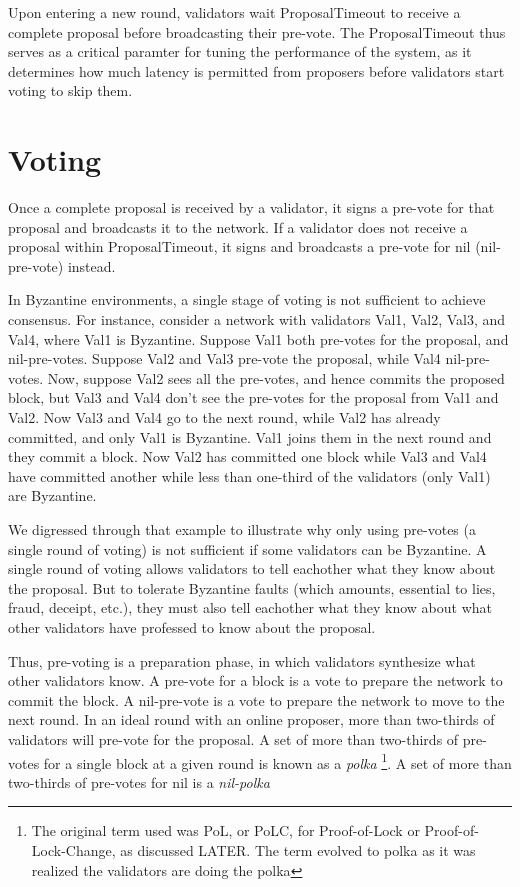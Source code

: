 Upon entering a new round, validators wait ProposalTimeout to receive a complete proposal before broadcasting their pre-vote.
The ProposalTimeout thus serves as a critical paramter for tuning the performance of the system,
as it determines how much latency is permitted from proposers before validators start voting to skip them.

\section{Voting}

Once a complete proposal is received by a validator, 
it signs a pre-vote for that proposal and broadcasts it to the network.
If a validator does not receive a proposal within ProposalTimeout, 
it signs and broadcasts a pre-vote for nil (nil-pre-vote) instead.

In Byzantine environments, a single stage of voting is not sufficient to achieve consensus.
For instance, consider a network with validators Val1, Val2, Val3, and Val4, where Val1 is Byzantine.
Suppose Val1 both pre-votes for the proposal, and nil-pre-votes.
Suppose Val2 and Val3 pre-vote the proposal, while Val4 nil-pre-votes.
Now, suppose Val2 sees all the pre-votes, and hence commits the proposed block,
but Val3 and Val4 don't see the pre-votes for the proposal from Val1 and Val2.
Now Val3 and Val4 go to the next round, while Val2 has already committed, and only Val1 is Byzantine.
Val1 joins them in the next round and they commit a block.
Now Val2 has committed one block while Val3 and Val4 have committed another while less than one-third of the validators (only Val1) are Byzantine.

We digressed through that example to illustrate why only using pre-votes (a single round of voting) 
is not sufficient if some validators can be Byzantine.
A single round of voting allows validators to tell eachother what they know about the proposal.	
But to tolerate Byzantine faults (which amounts, essential to lies, fraud, deceipt, etc.), 
they must also tell eachother what they know about what other validators have professed to know about the proposal.

Thus, pre-voting is a preparation phase, in which validators synthesize what other validators know.
A pre-vote for a block is a vote to prepare the network to commit the block.
A nil-pre-vote is a vote to prepare the network to move to the next round.
In an ideal round with an online proposer, more than two-thirds of validators will pre-vote for the proposal.
A set of more than two-thirds of pre-votes for a single block at a given round is known as a \emph{polka} \footnote{The original term used was PoL, or PoLC, for Proof-of-Lock or Proof-of-Lock-Change, as discussed LATER. The term evolved to polka as it was realized the validators are doing the polka}.
A set of more than two-thirds of pre-votes for nil is a \emph{nil-polka}

